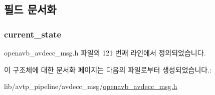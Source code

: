 \subsection{필드 문서화}
\subsubsection[{\texorpdfstring{current\+\_\+state}{current_state}}]{ current\+\_\+state}\hypertarget{structopenavb_avdecc_msg_params___client_change_notification__t_ac89386877910da849a824021b5a3ee3a}{}\label{structopenavb_avdecc_msg_params___client_change_notification__t_ac89386877910da849a824021b5a3ee3a}


openavb\+\_\+avdecc\+\_\+msg.\+h 파일의 121 번째 라인에서 정의되었습니다.



이 구조체에 대한 문서화 페이지는 다음의 파일로부터 생성되었습니다.\+:\begin{DoxyCompactItemize}
\item 
lib/avtp\+\_\+pipeline/avdecc\+\_\+msg/\hyperlink{openavb__avdecc__msg_8h}{openavb\+\_\+avdecc\+\_\+msg.\+h}\end{DoxyCompactItemize}
